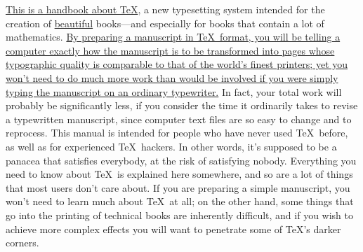 \underline{This is a handbook about \TeX},
a new typesetting system intended for the creation
of \underline{beautiful} books---and especially for books that contain a lot of
mathematics. \underline{By preparing a manuscript in \TeX\ format, you will be
telling a computer exactly how the manuscript is to be transformed into
pages whose typographic quality is comparable to that of the world's
finest printers; yet you won't need to do much more work than would be
involved if you were simply typing the manuscript on an ordinary
typewriter.} In fact, your total work will probably be significantly less,
if you consider the time it ordinarily takes to revise a typewritten manuscript,
since computer text files are so easy to change and to reprocess.
This manual is intended for people who have never used \TeX\ before, as
well as for experienced \TeX\ hackers. In other words, it's supposed to
be a panacea that satisfies everybody, at the risk of satisfying nobody.
Everything you need to know about \TeX\ is explained
here somewhere, and so are a lot of things that most users don't care about.
If you are preparing a simple manuscript, you won't need to
learn much about \TeX\ at all; on the other hand, some
things that go into the printing of technical books are inherently
difficult, and if you wish to achieve more complex effects you
will want to penetrate some of \TeX's darker corners.

\bye
